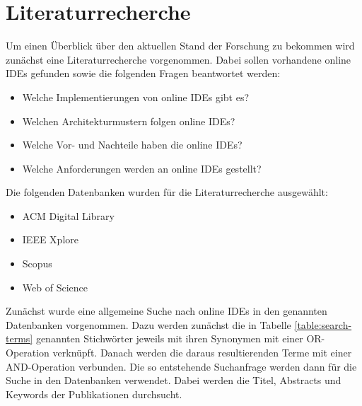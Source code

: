 \section{Literaturrecherche} \label{stand-der-technik-literaturrecherche}

Um einen Überblick über den aktuellen Stand der Forschung zu bekommen wird zunächst eine Literaturrecherche vorgenommen. Dabei sollen vorhandene online IDEs gefunden sowie die folgenden Fragen beantwortet werden:

\begin{itemize}
    \item Welche Implementierungen von online IDEs gibt es?
    \item Welchen Architekturmustern folgen online IDEs?
    \item Welche Vor- und Nachteile haben die online IDEs?
    \item Welche Anforderungen werden an online IDEs gestellt?
\end{itemize}

Die folgenden Datenbanken wurden für die Literaturrecherche ausgewählt:

\begin{itemize}
    \item ACM Digital Library
    \item IEEE Xplore
    \item Scopus
    \item Web of Science
\end{itemize}

Zunächst wurde eine allgemeine Suche nach online IDEs in den genannten Datenbanken vorgenommen. Dazu werden zunächst die in Tabelle \ref{table:search-terms} genannten Stichwörter jeweils mit ihren Synonymen mit einer OR-Operation verknüpft. Danach werden die daraus resultierenden Terme mit einer AND-Operation verbunden. Die so entstehende Suchanfrage werden dann für die Suche in den Datenbanken verwendet. Dabei werden die Titel, Abstracts und Keywords der Publikationen durchsucht.

